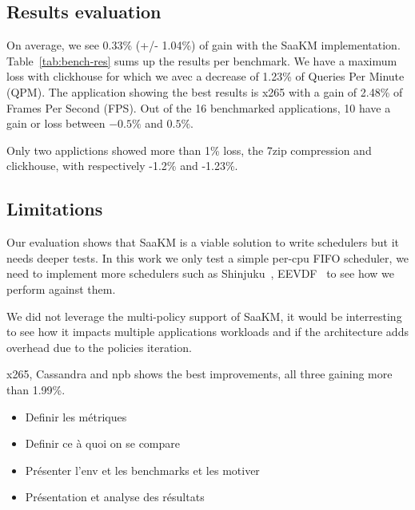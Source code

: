
\subsection{Results evaluation}
On average, we see 0.33\% (+/- 1.04\%) of gain with the SaaKM implementation. Table~\ref{tab:bench-res} sums up the results per benchmark. We have a maximum loss with clickhouse for which we avec a decrease of 1.23\% of Queries Per Minute (QPM). The application showing the best results is x265 with a gain of 2.48\% of Frames Per Second (FPS). Out of the 16 benchmarked applications, 10 have a gain or loss between $-0.5\%$ and $0.5\%$. 

Only two applictions showed more than 1\% loss, the 7zip compression and clickhouse, with respectively -1.2\% and -1.23\%. 

\subsection{Limitations}
Our evaluation shows that SaaKM is a viable solution to write schedulers but it needs deeper tests. In this work we only test a simple per-cpu FIFO scheduler, we need to implement more schedulers such as Shinjuku~\cite{shinjuku}, EEVDF~\cite{eevdf} to see how we perform against them. 

We did not leverage the multi-policy support of SaaKM, it would be interresting to see how it impacts multiple applications workloads and if the architecture adds overhead due to the policies iteration. 

x265, Cassandra and npb shows the best improvements, all three gaining more than 1.99\%. 
\begin{itemize}
        \item Definir les métriques
        \item Definir ce à quoi on se compare
        \item Présenter l'env et les benchmarks et les motiver
        \item Présentation et analyse des résultats
\end{itemize}

